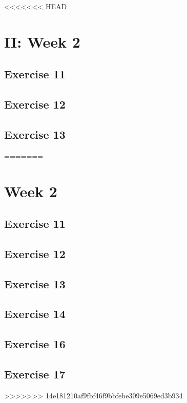 \documentclass[a4paper]{article}
\let\stdsection\section
\renewcommand\section{\newpage\stdsection}
\begin{document}
<<<<<<< HEAD
\section*{II: Week 2}

\subsection*{Exercise 11}



\newpage
\subsection*{Exercise 12}









\newpage
\subsection*{Exercise 13}











=======
\section*{Week 2}

\subsection*{Exercise 11}

\newpage
\subsection*{Exercise 12}

\newpage
\subsection*{Exercise 13}

\newpage
\subsection*{Exercise 14}








\newpage
\subsection*{Exercise 16}




\newpage
\subsection*{Exercise 17}

>>>>>>> 14e181210af9fbf46f9bbfebe309e5069ed3b934
\end{document}
